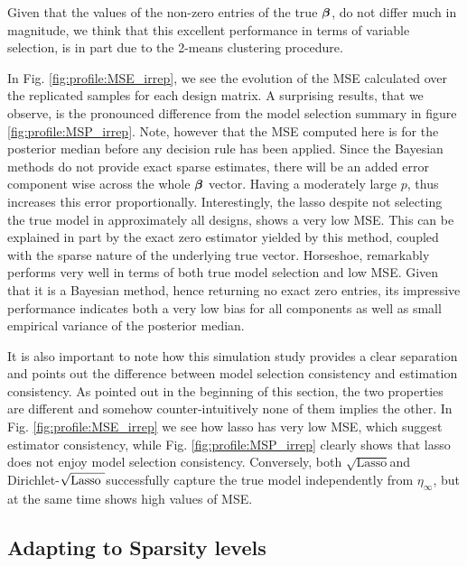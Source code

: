 \documentclass[10pt]{article}
\def\sql{$\sqrt{\text{Lasso}}$}
\def\sqdl{Dirichlet-$\sqrt{\text{\rm{Lasso} }}$}
\begin{document}
Given that the values of the non-zero entries of the true $\boldsymbol{\beta}$, do not differ much in magnitude, we think that this excellent performance in terms of variable selection, is in part due to the 2-means clustering procedure. 

In Fig. \ref{fig:profile:MSE_irrep}, we see the evolution of the MSE calculated over the replicated samples for each design matrix. A surprising results, that we observe, is the pronounced difference from the model selection summary in figure \ref{fig:profile:MSP_irrep}. Note, however that the MSE computed here is for the posterior median before any decision rule has been applied. Since the Bayesian methods do not provide exact sparse estimates, there will be an added error component wise across the whole $\boldsymbol{\beta}$ vector. Having a moderately large $p$, thus increases this error proportionally. Interestingly, the lasso despite not selecting the true model in approximately all designs, shows a very low MSE. This can be explained in part by the exact zero estimator yielded by this method, coupled with the sparse nature of the underlying true vector. Horseshoe, remarkably performs very well in terms of both true model selection and low MSE. Given that it is a Bayesian method, hence returning no exact zero entries, its impressive performance indicates both a very low bias for all components as well as small empirical variance of the posterior median.


It is also important to note how this simulation study provides a clear separation and points out the difference between model selection consistency and estimation consistency. As pointed out in the beginning of this section, the two properties are different and somehow counter-intuitively none of them implies the other. In Fig. \ref{fig:profile:MSE_irrep} we see how lasso has very low MSE, which suggest estimator consistency, while Fig. \ref{fig:profile:MSP_irrep} clearly shows that lasso does not enjoy model selection consistency. Conversely, both \sql and \sqdl successfully capture the true model independently from $\eta_{\infty}$, but at the same time shows high values of MSE.



\subsection{Adapting to Sparsity levels}
\end{document}
